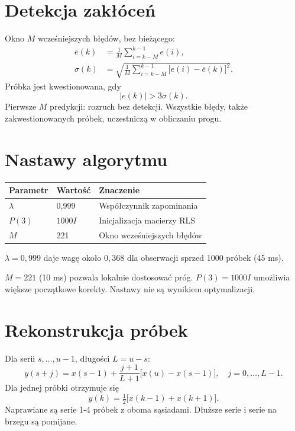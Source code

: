 \documentclass[11pt,a4paper]{article}
\begin{document}
\section{Detekcja zakłóceń}
Okno $M$ wcześniejszych błędów, bez bieżącego:
\begin{align}
\bar e(k)&=\frac{1}{M}\sum_{i=k-M}^{k-1}e(i),\\
\sigma(k)&=\sqrt{\frac{1}{M}\sum_{i=k-M}^{k-1}\bigl[e(i)-\bar e(k)\bigr]^2}.
\end{align}
Próbka jest kwestionowana, gdy
\begin{equation}
|e(k)|>3\sigma(k).
\end{equation}
Pierwsze $M$ predykcji: rozruch bez detekcji. Wszystkie błędy, także zakwestionowanych próbek, uczestniczą w obliczaniu progu.

\section{Nastawy algorytmu}
\begin{center}
\begin{tabular}{lll}
\toprule
Parametr & Wartość & Znaczenie\\
\midrule
$\lambda$ & 0,999 & Współczynnik zapominania\\
$P(3)$ & $1000I$ & Inicjalizacja macierzy RLS\\
$M$ & 221 & Okno wcześniejszych błędów\\
\bottomrule
\end{tabular}
\end{center}
$\lambda=0{,}999$ daje wagę około $0{,}368$ dla obserwacji sprzed 1000 próbek (45 ms).

$M=221$ (10 ms) pozwala lokalnie dostosować próg. $P(3)=1000I$ umożliwia większe początkowe korekty. Nastawy nie są wynikiem optymalizacji.

\section{Rekonstrukcja próbek}
Dla serii $s,\ldots,u-1$, długości $L=u-s$:
\begin{equation}
y(s+j)=x(s-1)+\frac{j+1}{L+1}\bigl[x(u)-x(s-1)\bigr],\quad j=0,\ldots,L-1.
\end{equation}
Dla jednej próbki otrzymuje się
\begin{equation}
y(k)=\tfrac12\bigl[x(k-1)+x(k+1)\bigr].
\end{equation}
Naprawiane są serie 1-4 próbek z oboma sąsiadami. Dłuższe serie i serie na brzegu są pomijane.
\end{document}
